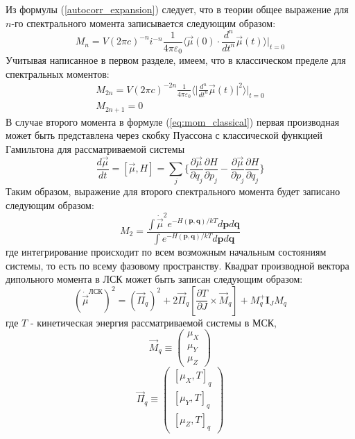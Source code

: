 \par
Из формулы (\ref{autocorr_expansion}) следует, что в теории общее выражение для $n\text{-го}$ спектрального момента записывается следующим образом:
\begin{equation}
M_n = V(2\pi c)^{-n}i^{-n}\frac{1}{4\pi \varepsilon_0}\Big\langle\vec{\mu}(0)\cdot \frac{d^n}{dt^n}\vec{\mu}(t) \Big\rangle\Big|_{t=0}
\end{equation}
Учитывая написанное в первом разделе, имеем, что в классическом пределе для спектральных моментов:
\begin{equation}
\label{eq:mom_classical}
\begin{aligned}
M_{2n} = V(2\pi c)^{-2n}\frac{1}{4\pi \varepsilon_0}\Big\langle\Big| \frac{d^n}{dt^n}\vec{\mu}(t)\Big|^2 \Big\rangle\Big|_{t=0}\\
M_{2n+1} = 0
\end{aligned}
\end{equation}
В случае второго момента в формуле (\ref{eq:mom_classical}) первая производная может быть представлена через скобку Пуассона с классической функцией Гамильтона для рассматриваемой системы
\[
\frac{d\vec{\mu}}{dt}=[\vec{\mu},H]= \sum_j\Big\{\frac{\partial\vec{\mu}}{\partial q_j}\frac{\partial H}{\partial p_j} - \frac{\partial\vec{\mu}}{\partial p_j}\frac{\partial H}{\partial q_j}\Big\}
\]
Таким образом, выражение для второго спектрального момента будет записано следующим образом:
\begin{equation}
\label{eq:M2}
M_2 = \frac{\int\dot{\vec{\mu}}^2 e^{-H(\mathbf{p},\mathbf{q})/kT}d\mathbf{p}d\mathbf{q}}{\int e^{-H(\mathbf{p},\mathbf{q})/kT}d\mathbf{p}d\mathbf{q}}
\end{equation}
где интегрирование происходит по всем возможным начальным состояниям системы, то есть по всему фазовому пространству.
Квадрат производной вектора дипольного момента в ЛСК может быть записан следующим образом:
\[
(\dot{\vec{\mu}}^{ЛСК})^2 = (\vec{\Pi}_q)^2 + 2\vec{\Pi}_q[\frac{\partial T}{\partial J}\times \vec{M}_q] + M_q^{+}\mathbf{I}_J M_q
\]
где $T$ - кинетическая энергия рассматриваемой системы в МСК, 
\[
\vec{M}_q \equiv\left(\begin{matrix}
\mu_X \\
\mu_Y \\
\mu_Z
\end{matrix} \right) 
\]
\[
\vec{\Pi}_q \equiv\left(\begin{matrix}
[\mu_X,T]_q \\
[\mu_Y,T]_q \\
[\mu_Z,T]_q 
\end{matrix} \right) 
\]

